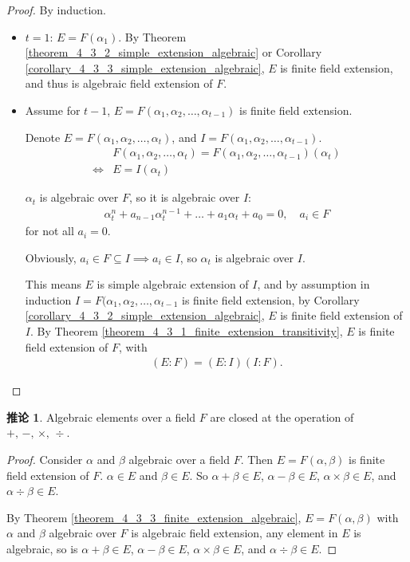 \documentclass[utf8]{ctexbook}
\theoremstyle{definition}
\newtheorem{corollary}{推论}[section]
\begin{document}
\begin{proof}
By induction.

\begin{itemize}
\item{$t=1$: $E= F(\alpha_1)$. By Theorem \ref{theorem_4_3_2_simple_extension_algebraic} or Corollary \ref{corollary_4_3_3_simple_extension_algebraic}, $E$ is finite field extension, and thus is algebraic field extension of $F$.}
\item{Assume for $t-1$, $E=F(\alpha_1, \alpha_2, \ldots, \alpha_{t-1})$ is finite field extension. 

Denote $E=F(\alpha_1, \alpha_2, \ldots, \alpha_t)$, and  $I = F(\alpha_1, \alpha_2, \ldots, \alpha_{t-1}) $. 
\begin{align*}
& F(\alpha_1, \alpha_2, \ldots, \alpha_t) = F(\alpha_1, \alpha_2, \ldots, \alpha_{t-1}) (\alpha_t) \\
\iff & E = I(\alpha_t) 
\end{align*}

$\alpha_t$ is algebraic over $F$, so it is algebraic over $I$:
\begin{align*}
\alpha_t ^n + a_{n-1} \alpha_t ^{n-1} + \ldots + a_1 \alpha_t + a_0 = 0, \quad a_i \in F
\end{align*} 
for not all $a_i = 0$. 

Obviously, $a_i \in F \subseteq I \implies a_i \in I$, so $\alpha_t$ is algebraic over $I$.

This means $E$ is simple algebraic extension of $I$, and by assumption in induction $I =  F(\alpha_1, \alpha_2, \ldots , \alpha_{t-1}$ is finite field extension, by Corollary \ref{corollary_4_3_2_simple_extension_algebraic}, $E$ is finite field extension of $I$. By Theorem \ref{theorem_4_3_1_finite_extension_transitivity}, $E$ is finite field extension of $F$, with
\begin{align*}
(E:F) = (E:I)(I:F) .
\end{align*}
}
\end{itemize}
\end{proof}

\begin{corollary}
\label{corollary_4_3_4_algebraic_closed}
Algebraic elements over a field $F$ are closed at the operation of $+, \, -, \, \times , \, \div $.
\end{corollary}

\begin{proof}
Consider $\alpha$ and $\beta$ algebraic over a field $F$. Then $E = F(\alpha, \beta)$ is finite field extension of $F$. $\alpha \in E$ and $\beta \in E$. So $\alpha + \beta \in E $, $\alpha - \beta \in E $, $\alpha \times \beta \in E $, and $\alpha \div \beta \in E $.

By Theorem \ref{theorem_4_3_3_finite_extension_algebraic}, $E= F(\alpha, \beta)$ with $\alpha$ and $\beta$ algebraic over $F$ is algebraic field extension, any element in $E$ is algebraic, so is $\alpha + \beta \in E $, $\alpha - \beta \in E $, $\alpha \times \beta \in E $, and $\alpha \div \beta \in E $.
\end{proof}
\end{document}
